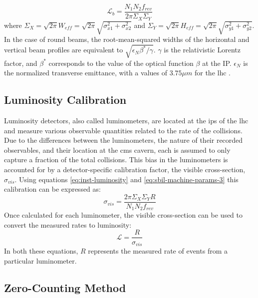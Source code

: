 \begin{equation}
\label{eq:sbil-machine-params-6}
\mathcal{L}_b = \frac{N_1 N_2 f_{rev}}{2 \pi \Sigma_X \Sigma_Y}
\end{equation}
where $\Sigma_X = \sqrt{2\pi} W_{eff} = \sqrt{2\pi} \sqrt{\sigma_{x1}^2 + \sigma_{x2}^2}$ and $\Sigma_Y = \sqrt{2\pi} H_{eff} = \sqrt{2\pi} \sqrt{\sigma_{y1}^2 + \sigma_{y2}^2}$. In the case of round beams, the root-mean-squared widths of the horizontal and vertical beam profiles are equivalent to $\sqrt{\epsilon_{N} \beta^{*} / \gamma}$. $\gamma$ is the relativistic Lorentz factor, and $\beta^{*}$ corresponds to the value of the optical function $\beta$ at the IP. $\epsilon_{N}$ is the normalized transverse emittance, with a values of $3.75\mu m$ for the \acrshort{lhc} \cite{Brüning:782076}.

\subsection{Luminosity Calibration}
\label{subsec:luminosity_calibration}

Luminosity detectors, also called luminometers, are located at the \acrshort{ip}s of the \acrshort{lhc} and measure various observable quantities related to the rate of the collisions. Due to the differences between the luminometers, the nature of their recorded observables, and their location at the \acrshort{cms} cavern, each is assumed to only capture a fraction of the total collisions. This bias in the luminometers is accounted for by a detector-specific calibration factor, the visible cross-section, $\sigma_{vis}$. Using equations \ref{eq:inst-luminosity} and \ref{eq:sbil-machine-params-3} this calibration can be expressed as:
\begin{equation}
    \label{eq:vis-cross-section}
    \sigma_{vis} = \frac{2 \pi \Sigma_X \Sigma_Y R}{N_1 N_2 f_{rev}}
\end{equation}
Once calculated for each luminometer, the visible cross-section can be used to convert the measured rates to luminosity:
\begin{equation}
    \label{eq:luminosity-from-rates}
    \mathcal{L} = \frac{R}{\sigma_{vis}}
\end{equation}
In both these equations, $R$ represents the measured rate of events from a particular luminometer.

\subsection{Zero-Counting Method}
\label{subsec:zero-counting}

